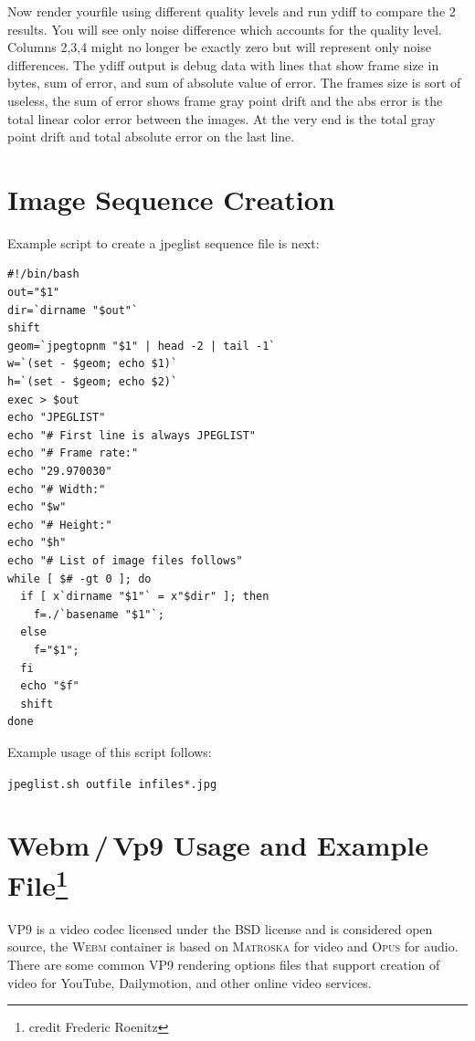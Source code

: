 Now render yourfile using different quality levels and run ydiff to compare the 2 results. You will see only noise difference which accounts for the quality level. Columns 2,3,4 might no longer be exactly zero but will represent only noise differences. The ydiff output is debug data with lines that show frame size in bytes, sum of error, and sum of absolute value of error. The frames size is sort of useless, the sum of error shows frame gray point drift and the abs error is the total linear color error between the images. At the very end is the total gray point drift and total absolute error on the last line.


\section{Image Sequence Creation}
\label{sec:image_sequence_creation}

Example script to create a jpeglist sequence file is next:
\begin{lstlisting}[numbers=none]
#!/bin/bash
out="$1"
dir=`dirname "$out"`
shift
geom=`jpegtopnm "$1" | head -2 | tail -1`
w=`(set - $geom; echo $1)`
h=`(set - $geom; echo $2)`
exec > $out
echo "JPEGLIST"
echo "# First line is always JPEGLIST"
echo "# Frame rate:"
echo "29.970030"
echo "# Width:"
echo "$w"
echo "# Height:"
echo "$h"
echo "# List of image files follows"
while [ $# -gt 0 ]; do
  if [ x`dirname "$1"` = x"$dir" ]; then
	f=./`basename "$1"`;
  else
	f="$1";
  fi
  echo "$f"
  shift
done
\end{lstlisting}
Example usage of this script follows:

\qquad \texttt{jpeglist.sh outfile infiles*.jpg}

\section{Webm\,/\,Vp9 Usage and Example File\protect\footnote{credit Frederic Roenitz}}%
\label{sec:webm/vp9_usage_example}

\textsc{VP9} is a video codec licensed under the BSD license and is
considered open source,
the \textsc{Webm} container is based on \textsc{Matroska} for video
and \textsc{Opus} for audio. There are some common \textsc{VP9} rendering
options files that support creation of video for YouTube,
Dailymotion, and other online video services.

